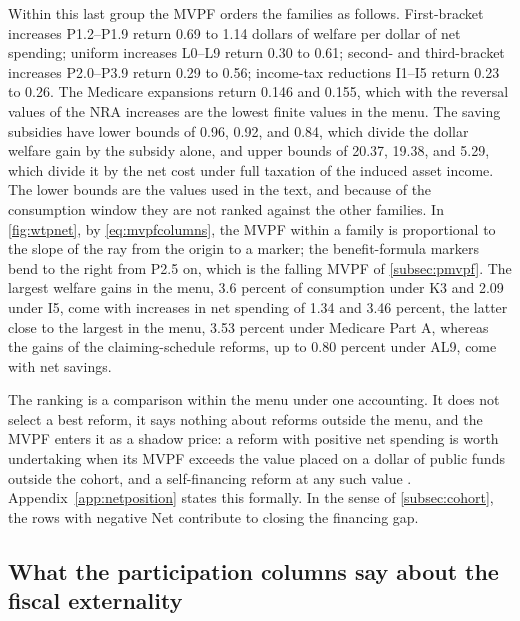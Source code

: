 Within this last group the MVPF orders the families as follows. First-bracket increases P1.2--P1.9 return 0.69 to 1.14 dollars of welfare per dollar of net spending; uniform increases L0--L9 return 0.30 to 0.61; second- and third-bracket increases P2.0--P3.9 return 0.29 to 0.56; income-tax reductions I1--I5 return 0.23 to 0.26. The Medicare expansions return 0.146 and 0.155, which with the reversal values of the NRA increases are the lowest finite values in the menu. %
The saving subsidies have lower bounds of 0.96, 0.92, and 0.84, which divide the dollar welfare gain by the subsidy alone, and upper bounds of 20.37, 19.38, and 5.29, which divide it by the net cost under full taxation of the induced asset income. The lower bounds are the values used in the text, and because of the consumption window they are not ranked against the other families. %
In \autoref{fig:wtpnet}, by \eqref{eq:mvpfcolumns}, the MVPF within a family is proportional to the slope of the ray from the origin to a marker; the benefit-formula markers bend to the right from P2.5 on, which is the falling MVPF of \autoref{subsec:pmvpf}. %
The largest welfare gains in the menu, 3.6 percent of consumption under K3 and 2.09 under I5, come with increases in net spending of 1.34 and 3.46 percent, the latter close to the largest in the menu, 3.53 percent under Medicare Part A, whereas the gains of the claiming-schedule reforms, up to 0.80 percent under AL9, come with net savings. %

The ranking is a comparison within the menu under one accounting. It does not select a best reform, it says nothing about reforms outside the menu, and the MVPF enters it as a shadow price: a reform with positive net spending is worth undertaking when its MVPF exceeds the value placed on a dollar of public funds outside the cohort, and a self-financing reform at any such value \citep{hendren2020unified}. Appendix~\ref{app:netposition} states this formally. In the sense of \autoref{subsec:cohort}, the rows with negative Net contribute to closing the financing gap.

\subsection{What the participation columns say about the fiscal externality}\label{subsec:externality}


